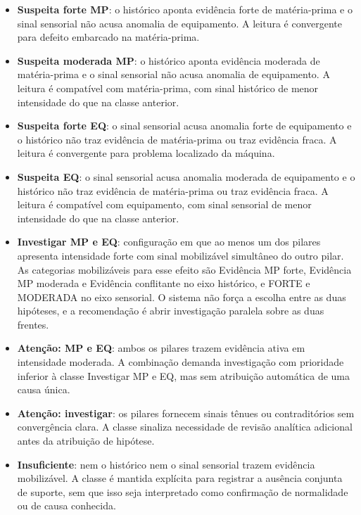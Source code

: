 \begin{itemize}
    \item \textbf{Suspeita forte MP}: o histórico aponta evidência forte de matéria-prima e o sinal sensorial não acusa anomalia de equipamento. A leitura é convergente para defeito embarcado na matéria-prima.
    \item \textbf{Suspeita moderada MP}: o histórico aponta evidência moderada de matéria-prima e o sinal sensorial não acusa anomalia de equipamento. A leitura é compatível com matéria-prima, com sinal histórico de menor intensidade do que na classe anterior.
    \item \textbf{Suspeita forte EQ}: o sinal sensorial acusa anomalia forte de equipamento e o histórico não traz evidência de matéria-prima ou traz evidência fraca. A leitura é convergente para problema localizado da máquina.
    \item \textbf{Suspeita EQ}: o sinal sensorial acusa anomalia moderada de equipamento e o histórico não traz evidência de matéria-prima ou traz evidência fraca. A leitura é compatível com equipamento, com sinal sensorial de menor intensidade do que na classe anterior.
    \item \textbf{Investigar MP e EQ}: configuração em que ao menos um dos pilares apresenta intensidade forte com sinal mobilizável simultâneo do outro pilar. As categorias mobilizáveis para esse efeito são Evidência MP forte, Evidência MP moderada e Evidência conflitante no eixo histórico, e FORTE e MODERADA no eixo sensorial. O sistema não força a escolha entre as duas hipóteses, e a recomendação é abrir investigação paralela sobre as duas frentes.
    \item \textbf{Atenção: MP e EQ}: ambos os pilares trazem evidência ativa em intensidade moderada. A combinação demanda investigação com prioridade inferior à classe Investigar MP e EQ, mas sem atribuição automática de uma causa única.
    \item \textbf{Atenção: investigar}: os pilares fornecem sinais tênues ou contraditórios sem convergência clara. A classe sinaliza necessidade de revisão analítica adicional antes da atribuição de hipótese.
    \item \textbf{Insuficiente}: nem o histórico nem o sinal sensorial trazem evidência mobilizável. A classe é mantida explícita para registrar a ausência conjunta de suporte, sem que isso seja interpretado como confirmação de normalidade ou de causa conhecida.
\end{itemize}

